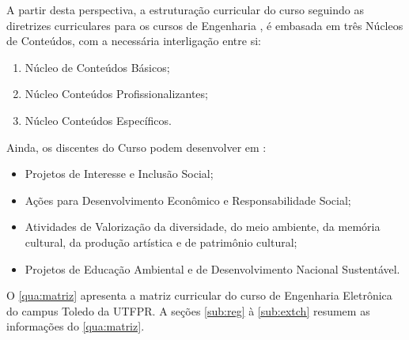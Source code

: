 A partir desta perspectiva, a estruturação curricular do curso seguindo as diretrizes curriculares para os cursos de Engenharia \cite{dcneng}, é embasada em três Núcleos de Conteúdos, com a necessária interligação entre si:

\begin{enumerate}
	\item 	Núcleo de Conteúdos Básicos;
	\item 	Núcleo Conteúdos Profissionalizantes;
	\item 	Núcleo Conteúdos Específicos.
\end{enumerate}

Ainda, os discentes do Curso podem desenvolver em :

\begin{itemize}
	\item 	Projetos de Interesse e Inclusão Social;
	\item	Ações para Desenvolvimento Econômico e Responsabilidade Social;
	\item	Atividades de Valorização da diversidade, do meio ambiente, da memória cultural, da produção artística e de patrimônio cultural;
	\item	Projetos de Educação Ambiental e de Desenvolvimento Nacional Sustentável.
\end{itemize}

O \autoref{qua:matriz} apresenta a matriz curricular do curso de Engenharia Eletrônica do campus Toledo da UTFPR.  A seções \ref{sub:reg} à \ref{sub:extch} resumem as informações do \autoref{qua:matriz}. 


